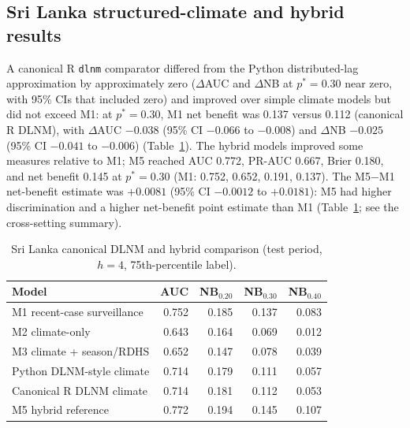 \documentclass[11pt,a4paper]{article}
\begin{document}
\subsection{Sri Lanka structured-climate and hybrid results}
A canonical R \texttt{dlnm} comparator differed from the Python distributed-lag approximation by approximately zero ($\Delta$AUC and $\Delta$NB at $p^*=0.30$ near zero, with 95\% CIs that included zero) and improved over simple climate models but did not exceed M1: at $p^*=0.30$, M1 net benefit was 0.137 versus 0.112 (canonical R DLNM), with $\Delta$AUC $-0.038$ (95\% CI $-0.066$ to $-0.008$) and $\Delta$NB $-0.025$ (95\% CI $-0.041$ to $-0.006$) (Table~\ref{tab:dlnmhybrid}). The hybrid models improved some measures relative to M1; M5 reached AUC 0.772, PR-AUC 0.667, Brier 0.180, and net benefit 0.145 at $p^*=0.30$ (M1: 0.752, 0.652, 0.191, 0.137). The M5$-$M1 net-benefit estimate was $+0.0081$ (95\% CI $-0.0012$ to $+0.0181$): M5 had higher discrimination and a higher net-benefit point estimate than M1 (Table~\ref{tab:dlnmhybrid}; see the cross-setting summary).

\begin{table}[htbp]
\centering
\caption{Sri Lanka canonical DLNM and hybrid comparison (test period, $h=4$, 75th-percentile label).}
\label{tab:dlnmhybrid}
\small
\begin{tabular}{lrrrr}
\toprule
Model & AUC & NB$_{0.20}$ & NB$_{0.30}$ & NB$_{0.40}$ \\
\midrule
M1 recent-case surveillance & 0.752 & 0.185 & 0.137 & 0.083 \\
M2 climate-only & 0.643 & 0.164 & 0.069 & 0.012 \\
M3 climate + season/RDHS & 0.652 & 0.147 & 0.078 & 0.039 \\
Python DLNM-style climate & 0.714 & 0.179 & 0.111 & 0.057 \\
Canonical R DLNM climate & 0.714 & 0.181 & 0.112 & 0.053 \\
M5 hybrid reference & 0.772 & 0.194 & 0.145 & 0.107 \\
\bottomrule
\end{tabular}
\end{table}
\end{document}
